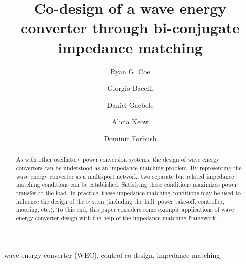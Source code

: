\documentclass[5p,times]{elsarticle}
\begin{document}
\begin{frontmatter}

\title{Co-design of a wave energy converter through bi-conjugate impedance matching}

\author[Sandia]{Ryan G. Coe}
\author[Sandia]{Giorgio Bacelli}
\author[Sandia]{Daniel Gaebele}
\author[Sandia]{Alicia Keow}
\author[Sandia]{Dominic Forbush}




\begin{abstract}
As with other oscillatory power conversion systems, the design of wave energy converters can be understood as an impedance matching problem. 
By representing the wave energy converter as a multi-port network, two separate but related impedance matching conditions can be established. 
Satisfying these conditions maximizes power transfer to the load. 
In practice, these impedance matching conditions may be used to influence the design of the system (including the hull, power take-off, controller, mooring, etc.). 
To this end, this paper considers some example applications of wave energy converter design with the help of the impedance matching framework.
\end{abstract}



\begin{keyword}
wave energy converter (WEC), control co-design, impedance matching
\end{keyword}

\end{frontmatter}
\end{document}

